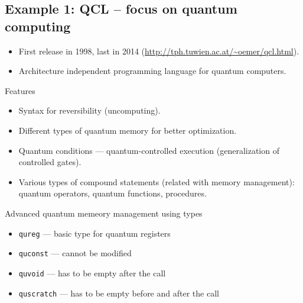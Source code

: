 \documentclass{beamer}
\begin{document}
\subsection{Example 1: QCL -- focus on quantum computing}

\begin{frame}{\insertsection}{\insertsubsection}
	\begin{itemize}
		\item<1-> First release in 1998, last in 2014 
		(\url{http://tph.tuwien.ac.at/~oemer/qcl.html}).
		\item<2-> Architecture independent programming language for quantum 
		computers.

	\end{itemize}
	
\end{frame}

\begin{frame}{\insertsection}{\insertsubsection}
    Features
    \begin{itemize}
        \item<1-> Syntax for reversibility (uncomputing).
        \item<2-> Different types of quantum memory for better optimization.
        \item<3-> Quantum conditions --- quantum-controlled execution 
        (generalization of controlled 
        gates).
        \item<4-> Various types of compound statements (related with memory 
        management): quantum operators, quantum functions, procedures.

    \end{itemize}
\end{frame}

\begin{frame}{\insertsection}{\insertsubsection}
    Advanced quantum memeory management using types
    \begin{itemize}
        \item<1-> \texttt{qureg} ---  basic type for quantum registers
        \item<2-> \texttt{quconst} --- cannot be modified
        \item<3-> \texttt{quvoid} --- has to be empty after the call
        \item<4-> \texttt{quscratch} --- has to be empty before and after the 
        call
    \end{itemize}
\end{frame}
\end{document}
